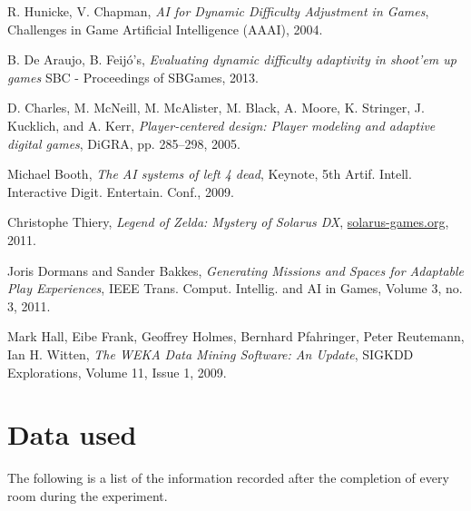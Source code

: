 \documentclass[a4paper]{article}
\begin{document}
\begin{multicols*}{2}
\begin{thebibliography}{9}
R. Hunicke, V. Chapman, 
\emph{AI for Dynamic Difficulty Adjustment in Games},
Challenges in Game Artificial Intelligence (AAAI),
2004.

B. De Araujo, B. Feij\'o's,
\emph{Evaluating dynamic difficulty adaptivity in shoot’em up games}
SBC - Proceedings of SBGames,
2013.

D. Charles, M. McNeill, M. McAlister, M. Black, A. Moore, K. Stringer, J. Kucklich, and A. Kerr, 
\emph{Player-centered design: Player modeling and
adaptive digital games},
DiGRA, pp. 285–298,
2005.

Michael Booth,
\emph{The AI systems of left 4 dead},
Keynote, 5th Artif. Intell. Interactive Digit. Entertain. Conf.,
2009.

Christophe Thiery,
\emph{Legend of Zelda: Mystery of Solarus DX},
\url{solarus-games.org},
2011.

Joris Dormans and Sander Bakkes,
\emph{Generating Missions and Spaces for
Adaptable Play Experiences},
{IEEE} Trans. Comput. Intellig. and {AI} in Games, Volume 3, no. 3,
2011.

Mark Hall, Eibe Frank, Geoffrey Holmes, Bernhard Pfahringer, Peter Reutemann, Ian H. Witten,
\emph{The WEKA Data Mining Software: An Update},
SIGKDD Explorations, Volume 11, Issue 1,
2009.

\end{thebibliography}
\end{multicols*}

\clearpage
\appendix
\section{Data used}
The following is a list of the information recorded after the completion of every room during the experiment.
\end{document}
